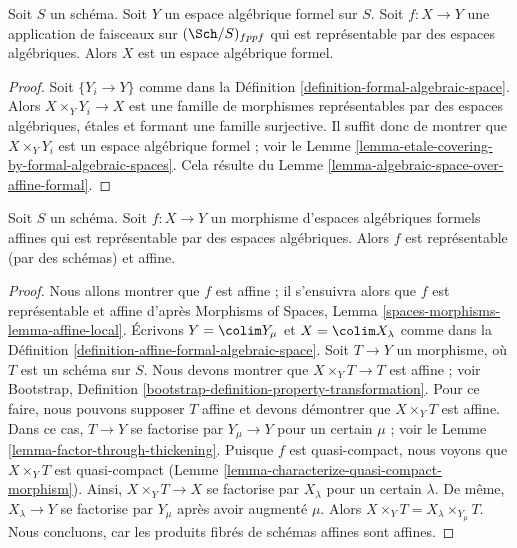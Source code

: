 \begin{lemma}
\label{lemma-representable-by-algebraic-spaces}
Soit $S$ un schéma. Soit $Y$ un espace algébrique formel sur $S$.
Soit $f : X \to Y$ une application de faisceaux sur $(\Sch/S)_{fppf}$ qui est
représentable par des espaces algébriques. Alors $X$ est un espace
algébrique formel.
\end{lemma}

\begin{proof}
Soit $\{Y_i \to Y\}$ comme dans la
Définition \ref{definition-formal-algebraic-space}.
Alors $X \times_Y Y_i \to X$ est une famille de morphismes
représentables par des espaces algébriques, étales et formant une famille
surjective. Il suffit donc de montrer que
$X \times_Y Y_i$ est un espace algébrique formel ; voir le
Lemme \ref{lemma-etale-covering-by-formal-algebraic-spaces}.
Cela résulte du Lemme \ref{lemma-algebraic-space-over-affine-formal}.
\end{proof}

\begin{lemma}
\label{lemma-affine-representable-by-algebraic-spaces}
Soit $S$ un schéma. Soit $f : X \to Y$ un morphisme
d'espaces algébriques formels affines qui est représentable par des
espaces algébriques. Alors $f$ est représentable (par des schémas) et affine.
\end{lemma}

\begin{proof}
Nous allons montrer que $f$ est affine ; il s'ensuivra alors que
$f$ est représentable et affine d'après
Morphisms of Spaces, Lemma \ref{spaces-morphisms-lemma-affine-local}.
Écrivons $Y = \colim Y_\mu$ et $X = \colim X_\lambda$ comme dans la
Définition \ref{definition-affine-formal-algebraic-space}.
Soit $T \to Y$ un morphisme, où $T$ est un schéma
sur $S$. Nous devons montrer que $X \times_Y T \to T$ est affine ; voir
Bootstrap, Definition
\ref{bootstrap-definition-property-transformation}.
Pour ce faire, nous pouvons supposer $T$ affine et devons démontrer
que $X \times_Y T$ est affine. Dans ce cas, $T \to Y$ se factorise
par $Y_\mu \to Y$ pour un certain $\mu$ ; voir le
Lemme \ref{lemma-factor-through-thickening}.
Puisque $f$ est quasi-compact, nous voyons que $X \times_Y T$ est
quasi-compact (Lemme \ref{lemma-characterize-quasi-compact-morphism}).
Ainsi, $X \times_Y T \to X$ se factorise par $X_\lambda$ pour un certain
$\lambda$. De même, $X_\lambda \to Y$ se factorise par $Y_\mu$
après avoir augmenté $\mu$. Alors
$X \times_Y T = X_\lambda \times_{Y_\mu} T$.
Nous concluons, car les produits fibrés de schémas affines sont affines.
\end{proof}

